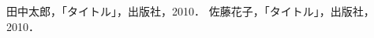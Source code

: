 \begin{thebibliography}{99}

  田中太郎，「タイトル」，出版社，2010．
    佐藤花子，「タイトル」，出版社，2010．

\end{thebibliography}

